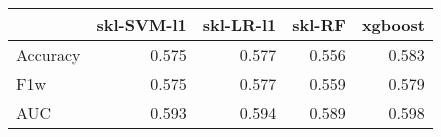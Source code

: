 \begin{tabular}{lrrrr}
\toprule
{} &  skl-SVM-l1 &  skl-LR-l1 &  skl-RF &  xgboost \\
\midrule
Accuracy &       0.575 &      0.577 &   0.556 &    0.583 \\
F1w      &       0.575 &      0.577 &   0.559 &    0.579 \\
AUC      &       0.593 &      0.594 &   0.589 &    0.598 \\
\bottomrule
\end{tabular}
